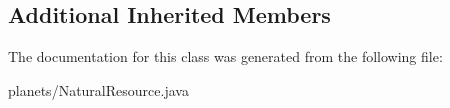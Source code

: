 \subsection*{Additional Inherited Members}


The documentation for this class was generated from the following file\+:\begin{DoxyCompactItemize}
\item 
planets/Natural\+Resource.\+java\end{DoxyCompactItemize}
